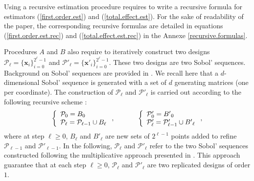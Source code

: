 \documentclass[]{elsarticle}
\theoremstyle{definition}
\newcommand{\bvec}[1]{\boldsymbol{#1}}
\newcommand{\vx}{\bvec{x}}
\begin{document}
Using a recursive estimation procedure requires to write a recursive formula for estimators (\ref{first.order.est}) and (\ref{total.effect.est}). For the sake of readability of the paper, the corresponding recursive formulas are detailed in equations (\ref{first.order.est.rec}) and (\ref{total.effect.est.rec}) in the Annexe \ref{recursive.formulas}.

Procedures $A$ and $B$ also require to iteratively construct two designs $\mathcal{P}_\ell=\{\vx_i\}_{i=0}^{2^\ell-1}$ and $\mathcal{P}'_\ell=\{{\vx'}_i\}_{i=0}^{2^\ell-1}$. These two designs are two Sobol' sequences. Background on Sobol' sequences are provided in \cite{crass}. We recall here that a $d$-dimensional Sobol' sequence is generated with a set of $d$ generating matrices (one per coordinate). The construction of $\mathcal{P}_\ell$ and $\mathcal{P}'_\ell$ is carried out according to the following recursive scheme :
\begin{equation}
\left\lbrace \begin{array}{l}
\mathcal{P}_0= B_0 \\
\mathcal{P}_\ell= \mathcal{P}_{\ell-1} \cup B_\ell \end{array}\right. ,\qquad
\hspace*{0.5cm}
\left\lbrace \begin{array}{l}
\mathcal{P}'_0= {B'}_0 \\
\mathcal{P}'_\ell= \mathcal{P}'_{\ell-1} \cup {B'}_\ell \end{array}\right.,
\label{rec.scheme}
\end{equation}
where at step $\ell\geq0$, $B_\ell$ and $B'_\ell$ are new sets of $2^{\ell-1}$ points added to refine $\mathcal{P}_{\ell-1}$ and $\mathcal{P}'_{\ell-1}$. In the following, $\mathcal{P}_\ell$ and $\mathcal{P}'_\ell$ refer to the two Sobol' sequences constructed following the multiplicative approach presented in \cite{crass}. This approach guarantee that at each step $\ell\geq0$, $\mathcal{P}_{\ell}$ and $\mathcal{P}'_{\ell}$ are two replicated designs of order $1$.
\end{document}
